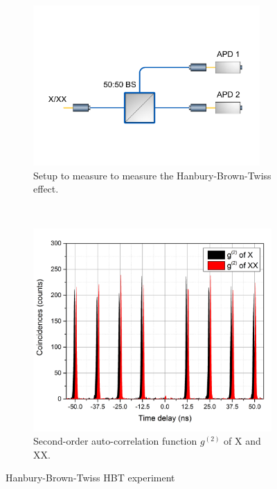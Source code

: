 \begin{figure}[H]
	\centering
	\begin{subfigure}[b]{0.48\textwidth}
		\centering
		\includegraphics[width=0.95\textwidth]{figures/quantum-dot/HBT_Fiber.pdf}
		\caption{Setup to measure to measure the Hanbury-Brown-Twiss effect.}
		\label{fig:hbt-fiber}
	\end{subfigure}%
	~ %
	\begin{subfigure}[b]{0.48\textwidth}
		\centering
		\includegraphics[width=\textwidth]{figures/quantum-dot/G2_X_XX.png}
		\caption{Second-order auto-correlation function $g^{(2)}$ of \ac{X} and \ac{XX}.}
		\label{fig:gs2-x-xx}
	\end{subfigure}
	\caption{Hanbury-Brown-Twiss \acs{HBT} experiment~\cite{schimpf_towards_2017}}
	\label{fig:hbt}
\end{figure}


